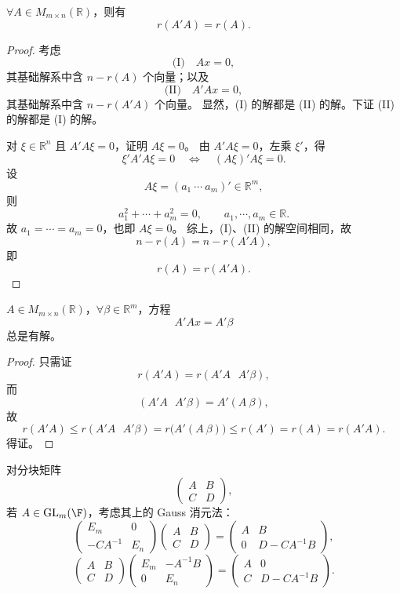 \begin{lemma}\label{3.5.8}
	$\forall A\in M_{m\times n}(\mathbb R)$，则有
	\[
	r(A'A)=r(A).
	\]
\end{lemma}

\begin{proof}
	考虑
	\[
	\text{(I)}\quad Ax=0,
	\]
	其基础解系中含 $n-r(A)$ 个向量；以及
	\[
	\text{(II)}\quad A'Ax=0,
	\]
	其基础解系中含 $n-r(A'A)$ 个向量。
	显然，(I) 的解都是 (II) 的解。下证 (II) 的解都是 (I) 的解。
	
	对 $\xi\in\mathbb R^n$ 且 $A'A\xi=0$，证明 $A\xi=0$。
	由 $A'A\xi=0$，左乘 $\xi'$，得
	\[
	\xi'A'A\xi=0\quad\Longleftrightarrow\quad (A\xi)'A\xi=0.
	\]
	设
	\[
	A\xi=(a_1\ \cdots\ a_m)'\in\mathbb R^m,
	\]
	则
	\[
	a_1^2+\cdots+a_m^2=0,
	\qquad a_1,\cdots,a_m\in\mathbb R.
	\]
	故 $a_1=\cdots=a_m=0$，也即 $A\xi=0$。
	综上，(I)、(II) 的解空间相同，故
	\[
	n-r(A)=n-r(A'A),
	\]
	即
	\[
	r(A)=r(A'A).
	\]
\end{proof}

\begin{proposition}\label{3.5.9}
	$A\in M_{m\times n}(\mathbb R)$，$\forall\beta\in\mathbb R^m$，方程
	\[
	A'Ax=A'\beta
	\]
	总是有解。
\end{proposition}

\begin{proof}
	只需证
	\[
	r(A'A)=r(A'A\ ~~ A'\beta),
	\]
	而
	\[
	(A'A\ ~~ A'\beta)=A'(A\ \beta),
	\]
	故
	\[
	r(A'A)\leq r(A'A\ ~~ A'\beta)
	= r\bigl(A'(A\ \beta)\bigr)
	\leq r(A')=r(A)=r(A'A).
	\]
	得证。
\end{proof}

对分块矩阵
\[
\begin{pmatrix}
	A&B\\
	C&D
\end{pmatrix},
\]
若 $A\in\operatorname{GL}_m(\F)$，考虑其上的 Gauss 消元法：
\[
\begin{pmatrix}
	E_m&0\\
	-CA^{-1}&E_n
\end{pmatrix}
\begin{pmatrix}
	A&B\\
	C&D
\end{pmatrix}
=
\begin{pmatrix}
	A&B\\
	0&D-CA^{-1}B
\end{pmatrix},
\]
\[
\begin{pmatrix}
	A&B\\
	C&D
\end{pmatrix}
\begin{pmatrix}
	E_m&-A^{-1}B\\
	0&E_n
\end{pmatrix}
=
\begin{pmatrix}
	A&0\\
	C&D-CA^{-1}B
\end{pmatrix}.
\]

